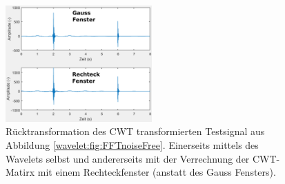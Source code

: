 \begin{figure}
	\centering
	\includegraphics[width=0.5\textwidth]{papers/wavelets/images/19-1_ICWT.png}
	\caption{Rücktransformation des CWT transformierten Testsignal aus Abbildung \ref{wavelet:fig:FFTnoiseFree}. Einerseits mittels des Wavelets selbst und andererseits mit der Verrechnung der CWT-Matirx mit einem Rechteckfenster (anstatt des Gauss Fensters).}
	\label{wavelet:fig:ICWT}
\end{figure}